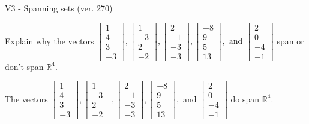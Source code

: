 \begin{exercise}
  \begin{exerciseTitle}V3 - Spanning sets (ver. 270)\end{exerciseTitle}
  \begin{exerciseStatement}
    Explain why the vectors \(\left[\begin{array}{r}
1 \\
4 \\
3 \\
-3
\end{array}\right] , \left[\begin{array}{r}
1 \\
-3 \\
2 \\
-2
\end{array}\right] , \left[\begin{array}{r}
2 \\
-1 \\
-3 \\
-3
\end{array}\right] , \left[\begin{array}{r}
-8 \\
9 \\
5 \\
13
\end{array}\right] , \text{ and } \left[\begin{array}{r}
2 \\
0 \\
-4 \\
-1
\end{array}\right]\) span or don't span \(\mathbb{R}^4\). 
	


  \end{exerciseStatement}
  \begin{exerciseAnswer}
   The vectors \(\left[\begin{array}{r}
1 \\
4 \\
3 \\
-3
\end{array}\right] , \left[\begin{array}{r}
1 \\
-3 \\
2 \\
-2
\end{array}\right] , \left[\begin{array}{r}
2 \\
-1 \\
-3 \\
-3
\end{array}\right] , \left[\begin{array}{r}
-8 \\
9 \\
5 \\
13
\end{array}\right] , \text{ and } \left[\begin{array}{r}
2 \\
0 \\
-4 \\
-1
\end{array}\right]\) 
  	 do  
	span \(\mathbb{R}^4\).
  



\end{exerciseAnswer}
\end{exercise}
